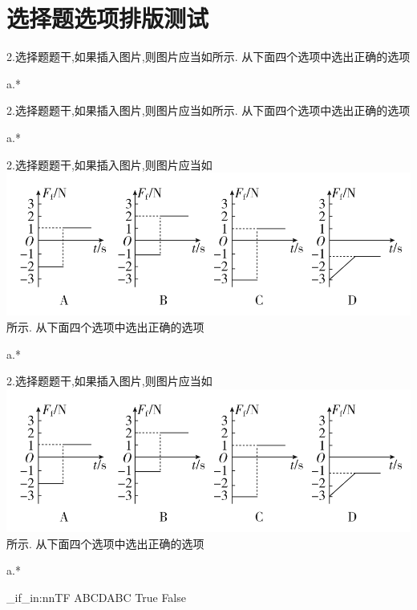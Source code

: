\documentclass[a4paper,fontset = windows]{ctexbook}
\begin{document}
\chapter{选择题选项排版测试}

 \begin{choices}
   2.选择题题干,如果插入图片,则图片应当如所示.
    从下面四个选项中选出正确的选项

    a.*

   2.选择题题干,如果插入图片,则图片应当如所示.
    从下面四个选项中选出正确的选项

    a.*

   2.选择题题干,如果插入图片,则图片应当如\includegraphics{1.png}所示.
    从下面四个选项中选出正确的选项

    a.*

   2.选择题题干,如果插入图片,则图片应当如\includegraphics{1.png}所示.
    从下面四个选项中选出正确的选项

    a.*

 \end{choices}

\ExplSyntaxOn
\str_if_in:nnTF {ABCD}{ABC}
{True}
{False}
\ExplSyntaxOff

\end{document}
